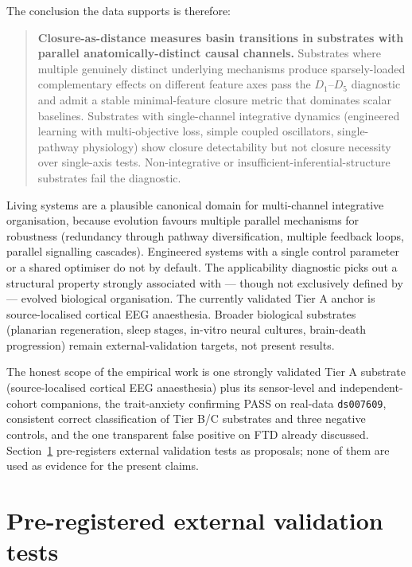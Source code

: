 \documentclass[11pt,a4paper]{article}
\begin{document}
The conclusion the data supports is therefore:

\begin{quote}
\textbf{Closure-as-distance measures basin transitions in substrates with parallel anatomically-distinct causal channels.} Substrates where multiple genuinely distinct underlying mechanisms produce sparsely-loaded complementary effects on different feature axes pass the $D_1$--$D_5$ diagnostic and admit a stable minimal-feature closure metric that dominates scalar baselines. Substrates with single-channel integrative dynamics (engineered learning with multi-objective loss, simple coupled oscillators, single-pathway physiology) show closure detectability but not closure necessity over single-axis tests. Non-integrative or insufficient-inferential-structure substrates fail the diagnostic.
\end{quote}

Living systems are a plausible canonical domain for multi-channel integrative organisation, because evolution favours multiple parallel mechanisms for robustness (redundancy through pathway diversification, multiple feedback loops, parallel signalling cascades). Engineered systems with a single control parameter or a shared optimiser do not by default. The applicability diagnostic picks out a structural property strongly associated with --- though not exclusively defined by --- evolved biological organisation. The currently validated Tier A anchor is source-localised cortical EEG anaesthesia. Broader biological substrates (planarian regeneration, sleep stages, in-vitro neural cultures, brain-death progression) remain external-validation targets, not present results.

The honest scope of the empirical work is one strongly validated Tier A substrate (source-localised cortical EEG anaesthesia) plus its sensor-level and independent-cohort companions, the trait-anxiety confirming PASS on real-data \texttt{ds007609}, consistent correct classification of Tier B/C substrates and three negative controls, and the one transparent false positive on FTD already discussed. Section~\ref{sec:external} pre-registers external validation tests as proposals; none of them are used as evidence for the present claims.

\section{Pre-registered external validation tests}\label{sec:external}
\end{document}
